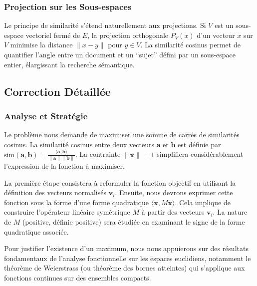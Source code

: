 \documentclass[11pt,a4paper]{report}
\begin{document}
\hypertarget{projection-sur-les-sous-espaces}{%
\subsubsection{Projection sur les
Sous-espaces}\label{projection-sur-les-sous-espaces}}

Le principe de similarité s'étend naturellement aux projections. Si
\(V\) est un sous-espace vectoriel fermé de \(E\), la projection
orthogonale \(P_V(x)\) d'un vecteur \(x\) sur \(V\) minimise la distance
\(\|x - y\|\) pour \(y \in V\). La similarité cosinus permet de
quantifier l'angle entre un document et un ``sujet'' défini par un
sous-espace entier, élargissant la recherche sémantique.

\hypertarget{correction-duxe9tailluxe9e}{%
\subsection{Correction Détaillée}\label{correction-duxe9tailluxe9e}}

\hypertarget{analyse-et-stratuxe9gie}{%
\subsubsection{Analyse et Stratégie}\label{analyse-et-stratuxe9gie}}

Le problème nous demande de maximiser une somme de carrés de similarités
cosinus. La similarité cosinus entre deux vecteurs \(\mathbf{a}\) et
\(\mathbf{b}\) est définie par
\(\text{sim}(\mathbf{a}, \mathbf{b}) = \frac{\langle \mathbf{a}, \mathbf{b} \rangle}{\|\mathbf{a}\| \|\mathbf{b}\|}\).
La contrainte \(\|\mathbf{x}\|=1\) simplifiera considérablement
l'expression de la fonction à maximiser.

La première étape consistera à reformuler la fonction objectif en
utilisant la définition des vecteurs normalisés \(\mathbf{v}_i\).
Ensuite, nous devrons exprimer cette fonction sous la forme d'une forme
quadratique \(\langle \mathbf{x}, M\mathbf{x} \rangle\). Cela implique
de construire l'opérateur linéaire symétrique \(M\) à partir des
vecteurs \(\mathbf{v}_i\). La nature de \(M\) (positive, définie
positive) sera étudiée en examinant le signe de la forme quadratique
associée.

Pour justifier l'existence d'un maximum, nous nous appuierons sur des
résultats fondamentaux de l'analyse fonctionnelle sur les espaces
euclidiens, notamment le théorème de Weierstrass (ou théorème des bornes
atteintes) qui s'applique aux fonctions continues sur des ensembles
compacts.
\end{document}
